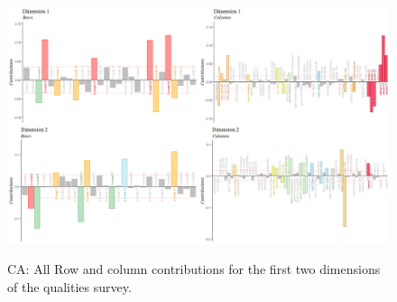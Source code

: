 \documentclass[
]{article}
\begin{document}
\begin{figure}  
  \centering  
  \caption{CA: All Row and column contributions for the first two dimensions of the qualities survey.}
    \includegraphics{./supmatsimgs/qconts.png}
  \label{fig:qconts}
\end{figure}
\end{document}
